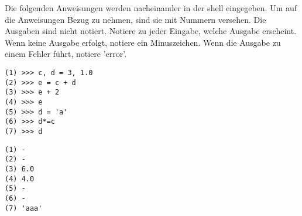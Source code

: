 \question[3]
Die folgenden Anweisungen werden nacheinander in der shell eingegeben. Um auf die Anweisungen Bezug
zu nehmen, sind sie mit Nummern versehen. Die Ausgaben sind nicht notiert.
Notiere zu jeder Eingabe, welche Ausgabe
erscheint. Wenn keine Ausgabe erfolgt, notiere
ein Minuszeichen. Wenn die Ausgabe zu einem Fehler führt, notiere 'error'.

\begin{lstlisting}
(1) >>> c, d = 3, 1.0
(2) >>> e = c + d
(3) >>> e + 2
(4) >>> e
(5) >>> d = 'a'
(6) >>> d*=c
(7) >>> d
\end{lstlisting}
\begin{solutionbox}{5cm}
\begin{lstlisting}
(1) -
(2) -
(3) 6.0
(4) 4.0
(5) -
(6) -
(7) 'aaa'
\end{lstlisting}
\end{solutionbox}
